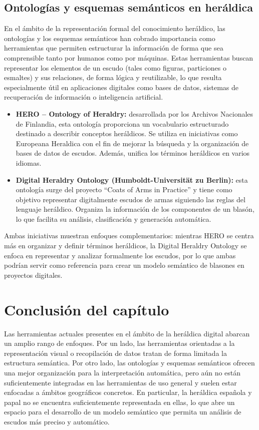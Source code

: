 \subsection{Ontologías y esquemas semánticos en heráldica}
En el ámbito de la representación formal del conocimiento heráldico, las ontologías y los esquemas 
semánticos han cobrado importancia como herramientas que permiten estructurar la información de
forma que sea comprensible tanto por humanos como por máquinas. Estas herramientas buscan representar
los elementos de un escudo (tales como figuras, particiones o esmaltes) y sus relaciones, de forma
lógica y reutilizable, lo que resulta especialmente útil en aplicaciones digitales como bases de 
datos, sistemas de recuperación de información o inteligencia artificial.

\begin{itemize}
    \item \textbf{HERO – Ontology of Heraldry:} desarrollada por los Archivos Nacionales de Finlandia, 
    esta ontología proporciona un vocabulario estructurado destinado a describir conceptos heráldicos.
    Se utiliza en iniciativas como Europeana Heraldica con el fin de mejorar la búsqueda y la organización
    de bases de datos de escudos. Además, unifica los términos heráldicos en varios idiomas.
    \item \textbf{Digital Heraldry Ontology (Humboldt-Universität zu Berlin):} esta ontología surge del
    proyecto “Coats of Arms in Practice” y tiene como objetivo representar digitalmente escudos de armas
    siguiendo las reglas del lenguaje heráldico. Organiza la información de los componentes de un blasón,
    lo que facilita su análisis, clasificación y generación automática.
\end{itemize}

Ambas iniciativas muestran enfoques complementarios: mientras HERO se centra más en organizar y
definir términos heráldicos, la Digital Heraldry Ontology se enfoca en representar y analizar
formalmente los escudos, por lo que ambas podrían servir como referencia para crear un modelo
semántico de blasones en proyectos digitales. 

\section{Conclusión del capítulo}
Las herramientas actuales presentes en el ámbito de la heráldica digital abarcan un amplio
rango de enfoques. Por un lado, las herramientas orientadas a la representación visual o
recopilación de datos tratan de forma limitada la estructura semántica. Por otro lado,
las ontologías y esquemas semánticos ofrecen una mejor organización para la interpretación
automática, pero aún no están suficientemente integradas en las herramientas de uso general y
suelen estar enfocadas a ámbitos geográficos concretos. En particular, la heráldica española y papal
no se encuentra suficientemente representada en ellas, lo que abre un espacio para el desarrollo
de un modelo semántico que permita un análisis de escudos más preciso y automático.